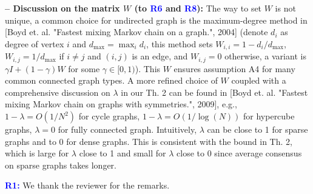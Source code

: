 \documentclass{article} %
\begin{document}
\textbf{-- Discussion on the matrix $W$ (to \textcolor{blue}{\textbf{R6}} and \textcolor{blue}{\textbf{R8}}):}
The way to set $W$ is not unique, a common choice for undirected graph is the maximum-degree method in [Boyd et. al. "Fastest mixing Markov chain on a graph.", 2004] (denote $d_i$ as degree of vertex $i$ and $d_{\max} = \max_i d_i$, this method sets $W_{i,i} = 1-d_i/d_{\max}$, $W_{i,j} = 1/d_{\max}$ if $i\neq j$ and $(i,j)$ is an edge,  and $W_{i,j} = 0$ otherwise, a variant is $\gamma I + (1-\gamma) W$ for some $\gamma \in [0,1)$). This $W$ ensures assumption A4 for many common connected graph types.  
A more refined choice of $W$ coupled with a comprehensive discussion on $\lambda$ in our Th. 2 can be found in [Boyd et. al. "Fastest mixing Markov chain on graphs with symmetries.", 2009], e.g., $1-\lambda =O(1/N^2)$ for cycle graphs, $1-\lambda =O(1/\log(N))$ for hypercube graphs, $\lambda = 0$ for fully connected graph. 
Intuitively, $\lambda$ can be close to 1 for sparse graphs and to 0 for dense graphs.
This is consistent with the bound in Th. 2, which is large for $\lambda$ close to 1 and small for $\lambda $ close to 0 since average consensus on sparse graphs takes longer.


\vspace{-2pt}
\textcolor{blue}{\textbf{R1:}}
We thank the reviewer for the remarks. \vspace{-4pt}
\end{document}
